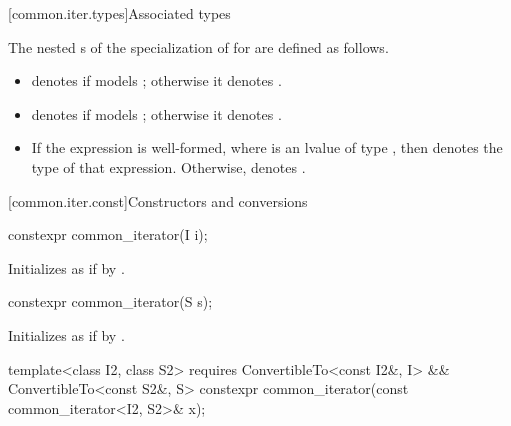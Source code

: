 [common.iter.types]{Associated types}

\pnum
The nested s of the specialization of
 for  are defined as follows.
\begin{itemize}
\item
{} denotes 
if  models ;
otherwise it denotes .

\item
{} denotes
if 
models ;
otherwise it denotes .

\item
If the expression  is well-formed,
where  is an lvalue of type ,
then  denotes the type of that expression.
Otherwise,  denotes .
\end{itemize}

[common.iter.const]{Constructors and conversions}

%
\begin{itemdecl}
constexpr common_iterator(I i);
\end{itemdecl}

\begin{itemdescr}
\pnum
\effects
Initializes  as if by .
\end{itemdescr}

%
\begin{itemdecl}
constexpr common_iterator(S s);
\end{itemdecl}

\begin{itemdescr}
\pnum
\effects Initializes  as if by
.
\end{itemdescr}

%
\begin{itemdecl}
template<class I2, class S2>
  requires ConvertibleTo<const I2&, I> && ConvertibleTo<const S2&, S>
    constexpr common_iterator(const common_iterator<I2, S2>& x);
\end{itemdecl}

